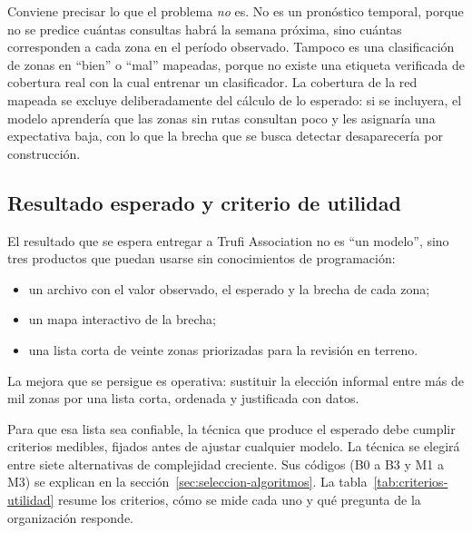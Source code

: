 Conviene precisar lo que el problema \emph{no} es. No es un pronóstico temporal, porque no
se predice cuántas consultas habrá la semana próxima, sino cuántas corresponden a cada zona
en el período observado. Tampoco es una clasificación de zonas en ``bien'' o ``mal''
mapeadas, porque no existe una etiqueta verificada de cobertura real con la cual entrenar
un clasificador. La cobertura de la red mapeada se excluye deliberadamente del cálculo de
lo esperado: si se incluyera, el modelo aprendería que las zonas sin rutas consultan poco y
les asignaría una expectativa baja, con lo que la brecha que se busca detectar desaparecería
por construcción.

\subsection{Resultado esperado y criterio de utilidad}
\label{sec:criterio-utilidad}

El resultado que se espera entregar a Trufi Association no es ``un modelo'', sino tres
productos que puedan usarse sin conocimientos de programación:
\begin{itemize}
  \item un archivo con el valor observado, el esperado y la brecha de cada zona;
  \item un mapa interactivo de la brecha;
  \item una lista corta de veinte zonas priorizadas para la revisión en terreno.
\end{itemize}
La mejora que se persigue es operativa: sustituir la elección informal entre más de mil
zonas por una lista corta, ordenada y justificada con datos.

Para que esa lista sea confiable, la técnica que produce el esperado debe cumplir criterios
medibles, fijados antes de ajustar cualquier modelo. La técnica se elegirá entre siete
alternativas de complejidad creciente. Sus códigos (B0 a B3 y M1 a M3) se explican en la
sección~\ref{sec:seleccion-algoritmos}. La tabla~\ref{tab:criterios-utilidad} resume los
criterios, cómo se mide cada uno y qué pregunta de la organización responde.

